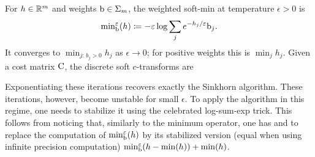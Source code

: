 \begin{defn}\label{def-discrete-soft-c-transform}
		For $h\in\mathbb{R}^m$ and weights $\mathrm{b}\in\Sigma_m$, the weighted soft-min at temperature $\epsilon>0$ is
		\[
			{\min}_{\mathrm{b}}^\varepsilon(h) \coloneqq -\varepsilon \log \sum_j e^{-h_j/\varepsilon} \mathrm{b}_j.
		\]
		It converges to $\min_{j:\,b_j>0}h_j$ as $\epsilon\to0$; for positive weights this is $\min_jh_j$. Given a cost matrix $\mathrm{C}$, the discrete soft $c$-transforms are
\end{defn}
Exponentiating these iterations recovers exactly the Sinkhorn algorithm. These iterations, however, become unstable for small $\epsilon$. To apply the algorithm in this regime, one needs to stabilize it using the celebrated log-sum-exp trick. This follows from noticing that, similarly to the minimum operator, one has
and to replace the computation of ${\min}_{\mathrm{b}}^\varepsilon(h)$ by its stabilized version (equal when using infinite precision computation) ${\min}_{\mathrm{b}}^\varepsilon(h-\min(h)) + \min(h)$.

